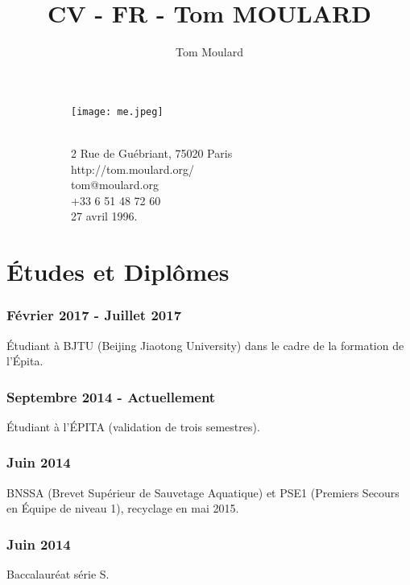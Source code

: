 \documentclass{article}
\begin{document}
    \title{CV - FR - Tom MOULARD}

    \author{Tom Moulard}

    \begin{center}
        \begin{figure}
            \centering
            \begin{subfigure}[b]{0.3\textwidth}
                \texttt{[image: me.jpeg]}
            \end{subfigure}
            \begin{subfigure}[b]{0.3\textwidth}
                {\huge\bfseries\theauthor}\\
                \vspace{.25em}
                2 Rue de Gu\'ebriant, 75020 Paris\\
                http://tom.moulard.org/\\
                tom@moulard.org\\
                +33 6 51 48 72 60\\
                27 avril 1996.
            \end{subfigure}
        \end{figure}
    \end{center}

    \hspace{-.25em}
    \section{\'Etudes et Dipl\^omes}
        \subsubsection{F\'evrier 2017 - Juillet 2017}
            \'Etudiant \`a BJTU (Beijing Jiaotong University) dans le cadre de la formation de l'\'Epita.
        \subsubsection{Septembre 2014 - Actuellement}
            \'Etudiant \`a l'\'EPITA (validation de trois semestres).
        \subsubsection{Juin 2014}
            BNSSA (Brevet Sup\'erieur de Sauvetage Aquatique) et PSE1 (Premiers Secours en \'Equipe de niveau 1), recyclage en mai 2015.
        \subsubsection{Juin 2014}
            Baccalaur\'eat s\'erie S.
\end{document}
